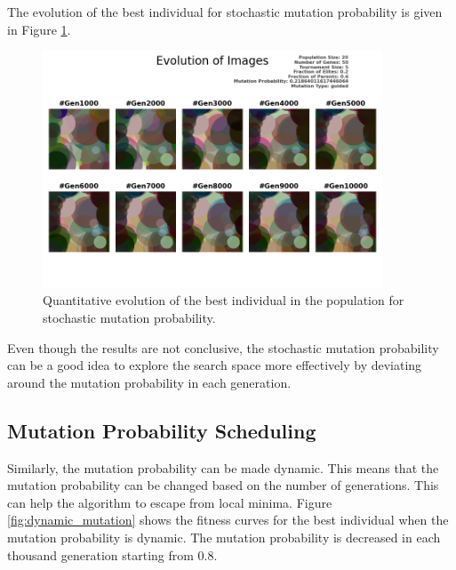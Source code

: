 \documentclass{assignment}
\begin{document}
The evolution of the best individual for stochastic mutation probability is given in Figure \ref{fig:stochastic_mutation_image}.
\begin{figure}[!htb]
    \centering
    \includegraphics[width=0.9\textwidth]{figures/images_outputSTOC_20_50_5_0.2_0.6_0.21864011617446064_guided.png}
    \caption{Quantitative evolution of the best individual in the population for stochastic mutation probability.}
    \label{fig:stochastic_mutation_image}
\end{figure}

Even though the results are not conclusive, the stochastic mutation probability can be a good idea to explore the search space more effectively by deviating around the mutation probability in each generation.

\subsection{Mutation Probability Scheduling}
Similarly, the mutation probability can be made dynamic. This means that the mutation probability can be changed based on the number of generations. This can help the algorithm to escape from local minima. Figure \ref{fig:dynamic_mutation} shows the fitness curves for the best individual when the mutation probability is dynamic. The mutation probability is decreased in each thousand generation starting from 0.8.
\end{document}
